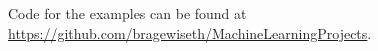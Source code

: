 \documentclass[twoside,11pt]{report}
\begin{document}
    \vspace{12mm}
    \noindent
    Code for the examples can be found at \\\url{https://github.com/bragewiseth/MachineLearningProjects}.


 

    
     





%
%
%
%




\vskip 0.2in

% 

\end{document}
